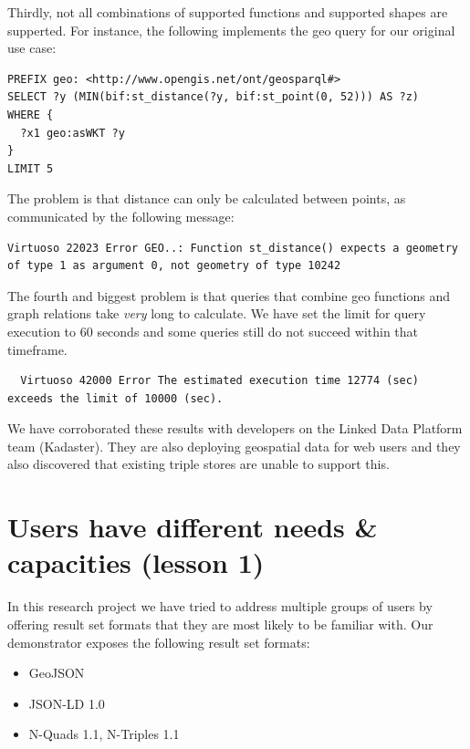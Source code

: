 \documentclass[a4paper]{scrartcl}
\begin{document}
Thirdly, not all combinations of supported functions and supported
shapes are supperted.  For instance, the following implements the geo
query for our original use case:

\begin{verbatim}
PREFIX geo: <http://www.opengis.net/ont/geosparql#>
SELECT ?y (MIN(bif:st_distance(?y, bif:st_point(0, 52))) AS ?z)
WHERE {
  ?x1 geo:asWKT ?y
}
LIMIT 5
\end{verbatim}

The problem is that distance can only be calculated between points, as
communicated by the following message:

\begin{lstlisting}
Virtuoso 22023 Error GEO..: Function st_distance() expects a geometry
of type 1 as argument 0, not geometry of type 10242
\end{lstlisting}

The fourth and biggest problem is that queries that combine geo
functions and graph relations take \emph{very} long to calculate.  We
have set the limit for query execution to 60 seconds and some queries
still do not succeed within that timeframe.

\begin{lstlisting}
  Virtuoso 42000 Error The estimated execution time 12774 (sec) exceeds the limit of 10000 (sec).
\end{lstlisting}

We have corroborated these results with developers on the Linked Data
Platform team (Kadaster).  They are also deploying geospatial data for
web users and they also discovered that existing triple stores are
unable to support this.


\section{Users have different needs \& capacities (lesson 1)}

In this research project we have tried to address multiple groups of
users by offering result set formats that they are most likely to be
familiar with.  Our demonstrator exposes the following result set
formats:

\begin{itemize}

\item GeoJSON

\item JSON-LD 1.0

\item N-Quads 1.1, N-Triples 1.1

\end{itemize}
\end{document}
